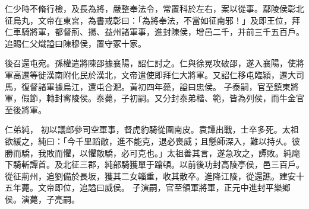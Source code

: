 \begin{pinyinscope}
 
 
 
 仁少時不脩行檢，及長為將，嚴整奉法令，常置科於左右，案以從事。鄢陵侯彰北征烏丸，文帝在東宮，為書戒彰曰：「為將奉法，不當如征南邪！」及即王位，拜仁車騎將軍，都督荊、揚、益州諸軍事，進封陳侯，增邑二千，并前三千五百戶。追賜仁父熾謚曰陳穆侯，置守冢十家。
 
 
後召還屯宛。孫權遣將陳邵據襄陽，詔仁討之。仁與徐晃攻破邵，遂入襄陽，使將軍高遷等徙漢南附化民於漢北，文帝遣使即拜仁大將軍。又詔仁移屯臨潁，遷大司馬，復督諸軍據烏江，還屯合淝。黃初四年薨，謚曰忠侯。
 子泰嗣，官至鎮東將軍，假節，轉封寗陵侯。泰薨，子初嗣。又分封泰弟楷、範，皆為列侯，而牛金官至後將軍。
 
 
仁弟純，
 初以議郎參司空軍事，督虎豹騎從圍南皮。袁譚出戰，士卒多死。太祖欲緩之，純曰：「今千里蹈敵，進不能克，退必喪威；且懸師深入，難以持乆。彼勝而驕，我敗而懼，以懼敵驕，必可克也。」太祖善其言，遂急攻之，譚敗。純麾下騎斬譚首。及北征三郡，純部騎獲單于蹹頓。以前後功封高陵亭侯，邑三百戶。從征荊州，追劉備於長坂，獲其二女輜重，收其散卒。進降江陵，從還譙。建安十五年薨。文帝即位，追謚曰威侯。
 子演嗣，官至領軍將軍，正元中進封平樂鄉侯。演薨，子亮嗣。
 
 
\end{pinyinscope}